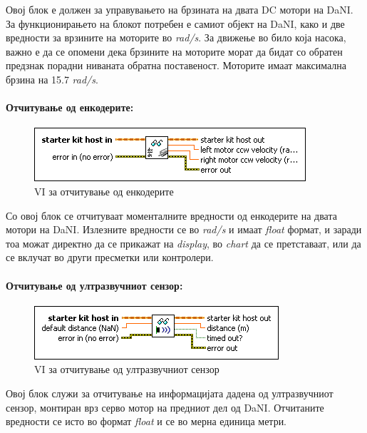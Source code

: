 \documentclass{article}
\begin{document}
Овој блок е должен за управувањето на брзината на двата DC мотори на DaNI. За функционирањето на блокот потребен е самиот објект на DaNI, како и две вредности за врзините на моторите во \textit{rad/s}. За движење во било која насока, важно е да се опомени дека брзините на моторите морат да бидат со обратен предзнак порадни ниваната обратна поставеност. Моторите имаат максимална брзина на 15.7 \textit{rad/s}.

\paragraph{Отчитување од енкодерите:\\}
\begin{figure}[h]
\includegraphics[width=0.45\linewidth]{read_dc.png}
\raggedright
\caption{VI за отчитување од енкодерите}
\label{fig:read_dc.png}
\end{figure}

Со овој блок се отчитуваат моменталните вредности од енкодерите на двата мотори на DaNI. Излезните вредности се во \textit{rad/s} и  имаат \textit{float} формат, и заради тоа можат директно да се прикажат на \textit{display}, во \textit{chart} да се претставаат, или да се вклучат во други пресметки или контролери.

\paragraph{Отчитување од ултразвучниот сензор:\\}
\begin{figure}[H]
\includegraphics[width=0.45\linewidth]{read_ping.png}
\raggedright
\caption{VI за отчитување од ултразвучниот сензор}
\label{fig:read_ping.png}
\end{figure}

Овој блок служи за отчитување на информацијата дадена од ултразвучниот сензор, монтиран врз серво мотор на предниот дел од DaNI. Отчитаните вредности се исто во формат \textit{float} и се во мерна единица метри.
\end{document}
